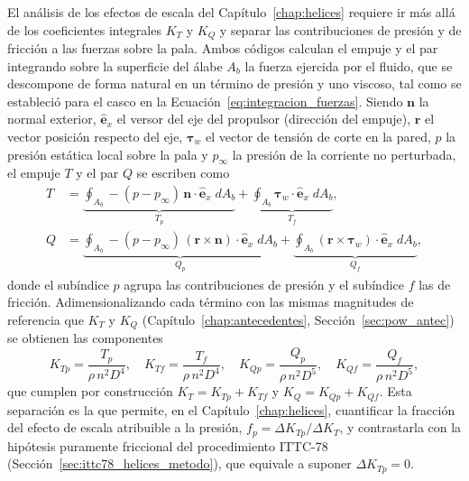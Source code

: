 El análisis de los efectos de escala del Capítulo~\ref{chap:helices} requiere ir más
allá de los coeficientes integrales $K_T$ y $K_Q$ y separar las contribuciones de
presión y de fricción a las fuerzas sobre la pala. Ambos códigos calculan el empuje y
el par integrando sobre la superficie del álabe $A_b$ la fuerza ejercida por el fluido, que se descompone de forma natural en un término de presión y uno viscoso, tal como se estableció para el casco en la Ecuación~\eqref{eq:integracion_fuerzas}. Siendo $\mathbf{n}$ la normal exterior, $\hat{\mathbf{e}}_x$ el versor del eje del propulsor (dirección del empuje), $\mathbf{r}$ el vector posición respecto del eje, $\boldsymbol{\tau}_w$ el vector de tensión de corte en la pared, $p$ la presión estática local sobre la pala y $p_\infty$ la presión de la corriente no perturbada, el empuje $T$ y el par $Q$ se escriben como
%
\begin{align}
        T &= \underbrace{\oint_{A_b} -(p - p_\infty)\,\mathbf{n}\cdot\hat{\mathbf{e}}_x \; dA_b}_{T_p}
       + \underbrace{\oint_{A_b} \boldsymbol{\tau}_w\cdot\hat{\mathbf{e}}_x \; dA_b}_{T_f},
    \\
    Q &= \underbrace{\oint_{A_b} -(p - p_\infty)\,(\mathbf{r}\times\mathbf{n})\cdot\hat{\mathbf{e}}_x \; dA_b}_{Q_p}
       + \underbrace{\oint_{A_b} (\mathbf{r}\times\boldsymbol{\tau}_w)\cdot\hat{\mathbf{e}}_x \; dA_b}_{Q_f},
\end{align}
%
donde el subíndice $p$ agrupa las contribuciones de presión y el subíndice $f$ las de
fricción. Adimensionalizando cada término con las mismas magnitudes de referencia que
$K_T$ y $K_Q$ (Capítulo~\ref{chap:antecedentes}, Sección~\ref{sec:pow_antec}) se
obtienen las componentes
%
\begin{equation}
    K_{Tp} = \frac{T_p}{\rho\,n^2 D^4}, \quad
    K_{Tf} = \frac{T_f}{\rho\,n^2 D^4}, \quad
    K_{Qp} = \frac{Q_p}{\rho\,n^2 D^5}, \quad
    K_{Qf} = \frac{Q_f}{\rho\,n^2 D^5},
    \label{eq:adim_helices}
\end{equation}
%
que cumplen por construcción $K_T = K_{Tp} + K_{Tf}$ y $K_Q = K_{Qp} + K_{Qf}$. Esta
separación es la que permite, en el Capítulo~\ref{chap:helices}, cuantificar la
fracción del efecto de escala atribuible a la presión,
$f_p = \Delta K_{Tp}/\Delta K_T$, y contrastarla con la hipótesis puramente friccional
del procedimiento ITTC-78 (Sección~\ref{sec:ittc78_helices_metodo}), que equivale a
suponer $\Delta K_{Tp} = 0$.

